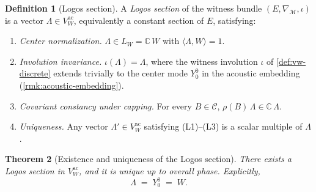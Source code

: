 \documentclass[11pt,a4paper]{article}
\theoremstyle{plain}
\newtheorem{theorem}{Theorem}[section]
\theoremstyle{definition}
\newtheorem{definition}[theorem]{Definition}
\theoremstyle{remark}
\numberwithin{equation}{section}
\newcommand{\Complex}{\mathbb{C}}
\begin{document}
\begin{definition}[Logos section]
\label{def:logos-section}
A \emph{Logos section} of the witness bundle
$(E,\nabla_{\mathcal{M}},\iota)$ is a vector
$\Lambda\in V_W^{\mathrm{ac}}$, equivalently a constant section of
$E$, satisfying:
\begin{enumerate}
  \item[\textup{(L1)}] \emph{Center normalization.}
        $\Lambda\in L_W=\Complex\,W$ with
        $\langle\Lambda,W\rangle=1$.
  \item[\textup{(L2)}] \emph{Involution invariance.}
        $\iota(\Lambda)=\Lambda$, where the witness involution
        $\iota$ of \cref{def:vw-discrete} extends trivially to the
        center mode $Y_0^0$ in the acoustic embedding
        (\cref{rmk:acoustic-embedding}).
  \item[\textup{(L3)}] \emph{Covariant constancy under capping.}
        For every $B\in\mathcal{C}$,
        $\rho(B)\,\Lambda\in\Complex\,\Lambda$.
  \item[\textup{(L4)}] \emph{Uniqueness.}  Any vector
        $\Lambda'\in V_W^{\mathrm{ac}}$ satisfying (L1)--(L3) is a
        scalar multiple of $\Lambda$.
\end{enumerate}
\end{definition}

\begin{theorem}[Existence and uniqueness of the Logos section]
\label{thm:logos-existence-uniqueness}
There exists a Logos section in $V_W^{\mathrm{ac}}$, and it is
unique up to overall phase.  Explicitly,
\[
  \boxed{\;\Lambda\;=\;Y_0^0\;=\;W.\;}
\]
\end{theorem}
\end{document}
